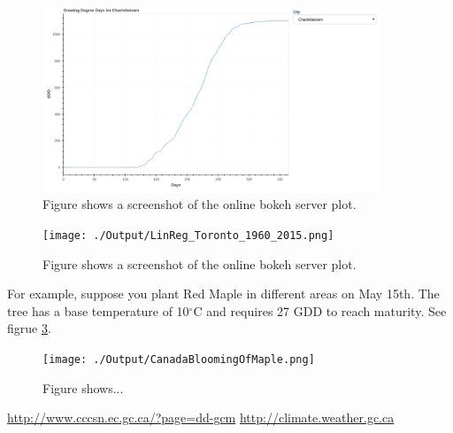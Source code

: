 \documentclass[12pt]{article}
\begin{document}
	\begin{figure}[!htbp]
		\centering
		\includegraphics[width=0.9\textwidth]{./Report/bokeh_serve_screenshot.png} 
		\caption{\scriptsize Figure shows a screenshot of the online bokeh server plot.}\label{BokehServer}		  
	\end{figure}
	
	\begin{figure}[!htbp]
		\centering
		\texttt{[image: ./Output/LinReg\_Toronto\_1960\_2015.png]} 
		\caption{\scriptsize Figure shows a screenshot of the online bokeh server plot.}\label{LinReg}		  
	\end{figure}

For example, suppose you plant Red Maple in different areas on May 15th.
The tree has a base temperature of 10${}^\circ$C and requires 27 GDD to reach maturity.
See figrue \ref{gddMapCaMaple}.
	\begin{figure}[!htbp]
		\centering
		\texttt{[image: ./Output/CanadaBloomingOfMaple.png]} 
		\caption{\scriptsize Figure shows...}\label{gddMapCaMaple}		  
	\end{figure}

\pagebreak
\begin{thebibliography}{2}
\url{http://www.cccsn.ec.gc.ca/?page=dd-gcm}
\url{http://climate.weather.gc.ca}
\end{thebibliography}
\end{document}
